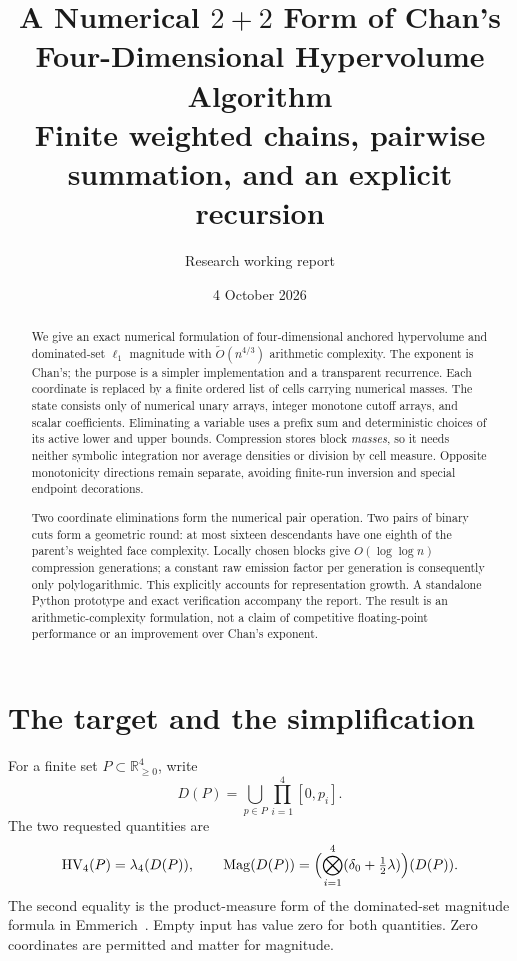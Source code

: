 \documentclass[12pt,a4paper]{article}
\title{A Numerical $2+2$ Form of Chan's\\Four-Dimensional Hypervolume Algorithm\\[.5em]
\large Finite weighted chains, pairwise summation, and an explicit recursion}
\author{Research working report}
\date{4 October 2026}
\theoremstyle{remark}
\newcommand{\HV}{\operatorname{HV}}
\newcommand{\Mag}{\operatorname{Mag}}
\newcommand{\1}{\mathbf1}
\newcommand{\wtO}{\widetilde O}
\begin{document}
\maketitle

\begin{abstract}
We give an exact numerical formulation of four-dimensional anchored
hypervolume and dominated-set $\ell_1$ magnitude with
$\wtO(n^{4/3})$ arithmetic complexity. The exponent is Chan's;
the purpose is a simpler implementation and a transparent recurrence.
Each coordinate is replaced by a finite ordered list of cells carrying
numerical masses. The state consists only of numerical unary arrays,
integer monotone cutoff arrays, and scalar coefficients. Eliminating a
variable uses a prefix sum and deterministic choices of its active lower
and upper bounds. Compression stores block \emph{masses}, so it needs
neither symbolic integration nor average densities or division by cell
measure. Opposite monotonicity directions remain separate, avoiding
finite-run inversion and special endpoint decorations.

Two coordinate eliminations form the numerical pair operation. Two pairs
of binary cuts form a geometric round: at most sixteen descendants have
one eighth of the parent's weighted face complexity. Locally chosen
blocks give $O(\log\log n)$ compression generations; a constant raw
emission factor per generation is consequently only polylogarithmic.
This explicitly accounts for representation growth. A standalone Python
prototype and exact verification accompany the report. The result is an
arithmetic-complexity formulation, not a claim of competitive floating-point
performance or an improvement over Chan's exponent.
\end{abstract}

\newpage
\tableofcontents
\newpage

\section{The target and the simplification}
For a finite set $P\subset\mathbb R_{\ge0}^4$, write
\[
 D(P)=\bigcup_{p\in P}\prod_{i=1}^4[0,p_i].
\]
The two requested quantities are
\[
 \HV_4(P)=\lambda_4(D(P)),\qquad
 \Mag(D(P))=
 \Bigl(\bigotimes_{i=1}^4(\delta_0+\tfrac12\lambda)\Bigr)(D(P)).
\]
The second equality is the product-measure form of the dominated-set
magnitude formula in Emmerich~\cite{emmerich}. Empty input has value zero
for both quantities. Zero coordinates are permitted and matter for magnitude.
\end{document}
